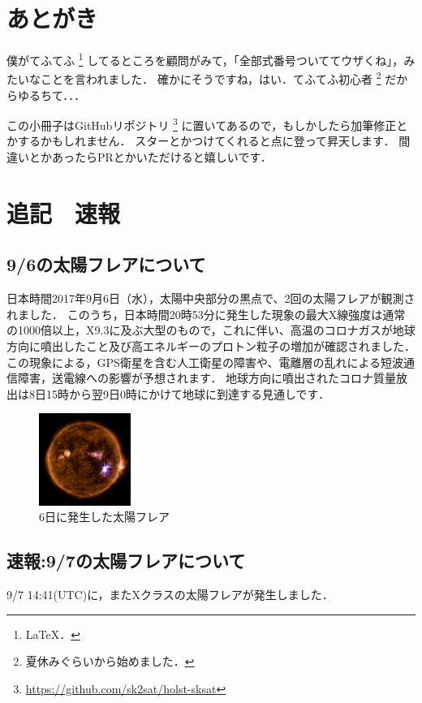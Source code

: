 \chapter*{あとがき}

僕がてふてふ
\footnote{\LaTeX．}
してるところを顧問がみて，「全部式番号ついててウザくね」，みたいなことを言われました．
確かにそうですね，はい．てふてふ初心者
\footnote{夏休みぐらいから始めました．}
だからゆるちて．．．


この小冊子はGitHubリポジトリ
\footnote{\url{https://github.com/sk2sat/holst-sksat}}
に置いてあるので，もしかしたら加筆修正とかするかもしれません．
スターとかつけてくれると点に登って昇天します．
間違いとかあったらPRとかいただけると嬉しいです．


\vspace{1pt}
\chapter*{追記　速報}
\section*{9/6の太陽フレアについて}
日本時間2017年9月6日（水），太陽中央部分の黒点で、2回の太陽フレアが観測されました．
このうち，日本時間20時53分に発生した現象の最大X線強度は通常の1000倍以上，X9.3に及ぶ大型のもので，これに伴い、高温のコロナガスが地球方向に噴出したこと及び高エネルギーのプロトン粒子の増加が確認されました．
この現象による，GPS衛星を含む人工衛星の障害や、電離層の乱れによる短波通信障害，送電線への影響が予想されます．
地球方向に噴出されたコロナ質量放出は8日15時から翌9日0時にかけて地球に到達する見通しです．

\begin{figure}[htbp]
\centering
\includegraphics[width=3cm]{0906-sun.jpg}
\caption{6日に発生した太陽フレア}
\end{figure}

\section*{速報:9/7の太陽フレアについて}
9/7 14:41(UTC)に，またXクラスの太陽フレアが発生しました．
